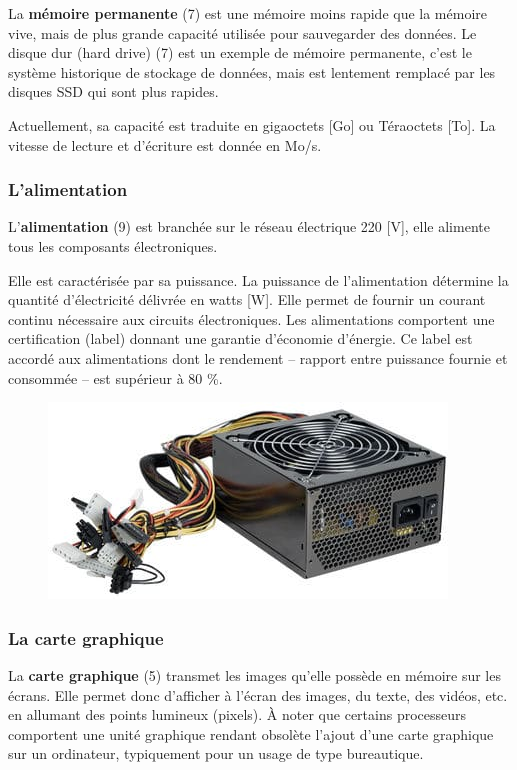 \documentclass[11pt, a4paper]{book}
\begin{document}
La {\bf mémoire permanente} (7) est une mémoire moins rapide que la mémoire vive, mais de plus grande capacité utilisée pour sauvegarder des données. Le disque dur (hard drive) (7) est un exemple de mémoire permanente, c'est le système historique de stockage de données, mais est lentement remplacé par les disques SSD qui sont plus rapides.

Actuellement, sa capacité est traduite en gigaoctets [Go] ou Téraoctets [To]. La vitesse de lecture et d'écriture est donnée en Mo/s.





\subsubsection{L'alimentation}

      
L'{\bf alimentation} (9) est branchée sur le réseau électrique 220 [V], elle alimente tous les composants électroniques.


Elle  est caractérisée par sa puissance. La puissance de l'alimentation détermine la quantité d'électricité délivrée en watts [W]. Elle permet de fournir un courant continu nécessaire aux circuits électroniques. Les alimentations comportent une certification (label) donnant une garantie d'économie d'énergie. Ce label est accordé aux alimentations dont le rendement – rapport entre puissance fournie et consommée – est supérieur à 80 \%.

\begin{figure}[h]
	\centering
	\includegraphics[scale=.5]{images/alimentation}

\end{figure}

\subsubsection{La carte graphique}
      

La {\bf carte graphique}  (5)  transmet les images qu'elle possède en mémoire sur les écrans. Elle permet donc d'afficher à l'écran des images, du texte, des vidéos, etc. en allumant des points lumineux (pixels). À noter que certains processeurs comportent une unité graphique rendant obsolète l'ajout d'une carte graphique sur un ordinateur, typiquement pour un usage de type bureautique.
\end{document}
